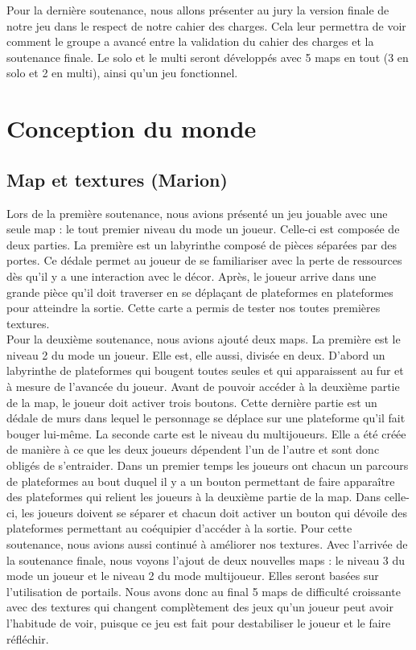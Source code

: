 \documentclass[a4paper , 12pt]{article}
\begin{document}
	\quad

Pour la dernière soutenance, nous allons présenter au jury la version finale de notre jeu dans le respect de notre cahier des charges.
Cela leur permettra de voir comment le groupe a avancé entre la validation du cahier des charges et la soutenance finale.
Le solo et le multi seront développés avec 5 maps en tout (3 en solo et 2 en multi), ainsi qu’un jeu fonctionnel.

\newpage

\section{Conception du monde}

	\subsection {Map et textures (Marion)}

\quad

Lors de la première soutenance, nous avions présenté un jeu jouable avec une seule map : le tout premier niveau du mode un joueur. Celle-ci est composée de deux parties. La première est un labyrinthe composé de pièces séparées par des portes. Ce dédale permet au joueur de se familiariser avec la perte de ressources dès qu’il y a une interaction avec le décor. Après, le joueur arrive dans une grande pièce qu’il doit traverser en se déplaçant de plateformes en plateformes pour atteindre la sortie. Cette carte a permis de tester nos toutes premières textures.\\

Pour la deuxième soutenance, nous avions ajouté deux maps. La première est le niveau 2 du mode un joueur. Elle est, elle aussi, divisée en deux. D’abord un labyrinthe de plateformes qui bougent toutes seules et qui apparaissent au fur et à mesure de l’avancée du joueur. Avant de pouvoir accéder à la deuxième partie de la map, le joueur doit activer trois boutons. Cette dernière partie est un dédale de murs dans lequel le personnage se déplace sur une plateforme qu’il fait bouger lui-même. La seconde carte est le niveau du multijoueurs. Elle a été créée de manière à ce que les deux joueurs dépendent l’un de l’autre et sont donc obligés de s’entraider. Dans un premier temps les joueurs ont chacun un parcours de plateformes au bout duquel il y a un bouton permettant de faire apparaître des plateformes qui relient les joueurs à la deuxième partie de la map. Dans celle-ci, les joueurs doivent se séparer et chacun doit activer un bouton qui dévoile des plateformes permettant au coéquipier d’accéder à la sortie. Pour cette soutenance, nous avions aussi continué à améliorer nos textures.
Avec l’arrivée de la soutenance finale, nous voyons l’ajout de deux nouvelles maps : le niveau 3 du mode un joueur et le niveau 2 du mode multijoueur. Elles seront basées sur l’utilisation de portails. Nous avons donc au final 5 maps de difficulté croissante avec des textures qui changent complètement des jeux qu’un joueur peut avoir l’habitude de voir, puisque ce jeu est fait pour destabiliser le joueur et le faire réfléchir. 
\quad
\end{document}
